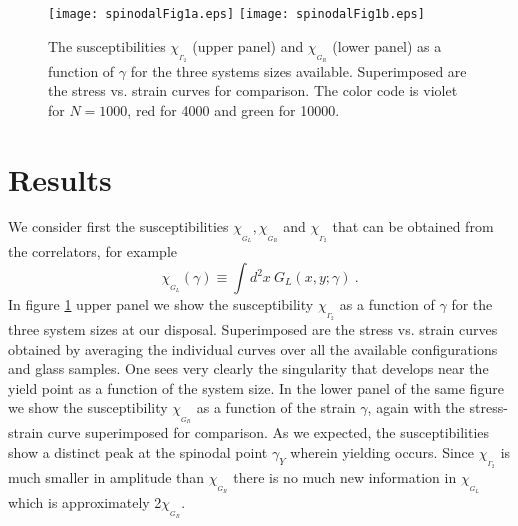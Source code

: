 \documentclass[9pt,twocolumn,twoside]{pnas-new}
\begin{document}
\begin{figure}[h!]
 \texttt{[image: spinodalFig1a.eps]}
 \texttt{[image: spinodalFig1b.eps]}
 \caption{The susceptibilities $\chi_{_{\Gamma_2}}$ (upper panel) and $\chi_{_{G_R}}$ (lower panel) as a function of $\gamma$ for the three systems sizes available. Superimposed are the stress vs. strain curves for comparison.
 The color code is violet for $N=1000$, red for 4000 and green for 10000.}  \label{sus}
\end{figure}

\section*{Results}

We consider first the susceptibilities $\chi_{_{G_L}}, \chi_{_{G_R}}$ and $\chi_{_{\Gamma_2}}$ that can be obtained from the correlators, for example
\begin{equation}
 \chi_{_{G_L}}(\gamma) \equiv \int d^2 x\ G_L(x,y;\gamma) \ .
\end{equation}
 In figure \ref{sus} upper panel we show the susceptibility $\chi_{_{\Gamma_2}}$ as a function of $\gamma$ for the three system sizes at our disposal. Superimposed are the stress vs. strain curves obtained by averaging
 the individual curves over all the available configurations and glass samples. One sees very clearly the singularity that
 develops near the yield point as a function of the system size. In the lower panel of the same figure we show the susceptibility $\chi_{_{G_R}}$ as a function of the strain $\gamma$, again with the stress-strain curve superimposed for comparison. As we expected, the susceptibilities show a distinct peak at the spinodal point $\gamma_Y$ wherein yielding occurs. Since $\chi_{_{\Gamma_2}}$ is much smaller in amplitude than $\chi_{_{G_R}}$ there is no much new information in $\chi_{_{G_L}}$ which is approximately 2$\chi_{_{G_R}}$.
\end{document}
